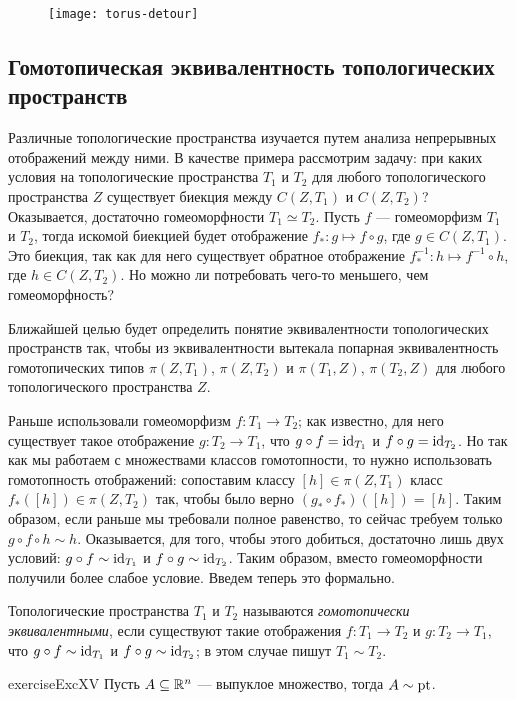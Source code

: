 \documentclass[main]{subfiles}
\begin{document}
\begin{figure}[H]
	\centering \texttt{[image: torus-detour]}
\end{figure}

\subsection{Гомотопическая эквивалентность топологических пространств}

Различные топологические пространства изучается путем анализа непрерывных отображений между ними. В качестве примера
рассмотрим задачу: при каких условия на топологические пространства $ T_1 $ и $ T_2 $ для любого топологического
пространства $ Z $ существует биекция между $ C(Z, T_1) $ и $ C(Z, T_2) $? Оказывается, достаточно гомеоморфности
$ T_1 \simeq T_2 $. Пусть $ f $ --- гомеоморфизм $ T_1 $ и $ T_2 $, тогда искомой биекцией будет отображение
$ f_* \colon g \mapsto f \circ g $, где $ g \in C(Z, T_1) $. Это биекция, так как для него существует
обратное отображение $ f_*^{-1} \colon h \mapsto f^{-1} \circ h $, где $ h \in C(Z, T_2) $. Но можно ли потребовать
чего-то меньшего, чем гомеоморфность?

Ближайшей целью будет определить понятие эквивалентности топологических пространств так, чтобы из эквивалентности
вытекала попарная эквивалентность гомотопических типов $ \pi(Z, T_1) $, $ \pi(Z, T_2) $ и $ \pi(T_1, Z) $,
$ \pi(T_2, Z) $ для любого топологического пространства $ Z $.

Раньше использовали гомеоморфизм $ f \colon T_1 \to T_2 $; как известно, для него существует такое отображение
$ g \colon T_2 \to T_1 $, что  $ g \circ f = \operatorname{id}_{T_1} $ и $ f \circ g = \operatorname{id}_{T_2} $. Но так как мы работаем с
множествами классов гомотопности, то нужно использовать гомотопность отображений: сопоставим классу
$ [h] \in \pi(Z, T_1) $ класс $ f_*([h]) \in \pi(Z, T_2) $ так, чтобы было верно $ (g_* \circ f_*) ([h]) = [h] $.
Таким образом, если раньше мы требовали полное равенство, то сейчас требуем только
$ g \circ f \circ h \sim h $. Оказывается, для того, чтобы этого добиться, достаточно лишь двух условий:
$ g \circ f \sim \operatorname{id}_{T_1} $ и $ f \circ g \sim \operatorname{id}_{T_2} $. Таким образом, вместо гомеоморфности получили
более слабое условие. Введем теперь это формально.

\begin{definition}
	Топологические пространства $ T_1 $ и $ T_2 $ называются \emph{гомотопически эквивалентными}, если существуют такие
	отображения $ f \colon T_1 \to T_2 $ и $ g \colon T_2 \to T_1 $, что $ g \circ f \sim \operatorname{id}_{T_1} $ и
	$ f \circ g \sim \operatorname{id}_{T_2} $; в этом случае пишут $ T_1 \sim T_2 $.
\end{definition}

\begin{restatable}{exercise}{ExcXV}
	Пусть $ A \subseteq \mathbb{R}^n $ --- выпуклое множество, тогда $ A \sim \operatorname{pt} $.
\end{restatable}
\end{document}
